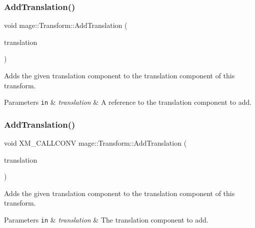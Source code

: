 \subsubsection{\texorpdfstring{Add\+Translation()}{AddTranslation()}\hspace{0.1cm}{\footnotesize\ttfamily [2/3]}}
{\footnotesize\ttfamily void mage\+::\+Transform\+::\+Add\+Translation (\begin{DoxyParamCaption}\item[{const X\+M\+F\+L\+O\+A\+T3 \&}]{translation }\end{DoxyParamCaption})\hspace{0.3cm}{\ttfamily [noexcept]}}

Adds the given translation component to the translation component of this transform.


\begin{DoxyParams}[1]{Parameters}
\mbox{\tt in}  & {\em translation} & A reference to the translation component to add. \\
\hline
\end{DoxyParams}
\hypertarget{structmage_1_1_transform_a931911a2ef61b9a74be444e4c65ee46a}{}\label{structmage_1_1_transform_a931911a2ef61b9a74be444e4c65ee46a} 
\subsubsection{\texorpdfstring{Add\+Translation()}{AddTranslation()}\hspace{0.1cm}{\footnotesize\ttfamily [3/3]}}
{\footnotesize\ttfamily void X\+M\+\_\+\+C\+A\+L\+L\+C\+O\+NV mage\+::\+Transform\+::\+Add\+Translation (\begin{DoxyParamCaption}\item[{F\+X\+M\+V\+E\+C\+T\+OR}]{translation }\end{DoxyParamCaption})\hspace{0.3cm}{\ttfamily [noexcept]}}

Adds the given translation component to the translation component of this transform.


\begin{DoxyParams}[1]{Parameters}
\mbox{\tt in}  & {\em translation} & The translation component to add. \\
\hline
\end{DoxyParams}
\hypertarget{structmage_1_1_transform_a1161f8c965e071dd59f1780d7a06952b}{}\label{structmage_1_1_transform_a1161f8c965e071dd59f1780d7a06952b} 
